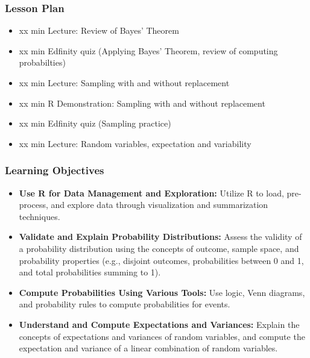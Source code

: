 \begin{frame}
    \frametitle{Lesson Plan}
    \begin{itemize}
        \item xx min Lecture: Review of Bayes' Theorem
        \item xx min Edfinity quiz (Applying Bayes' Theorem, review of computing probabilties)
        \item xx min Lecture: Sampling with and without replacement
        \item xx min R Demonstration: Sampling with and without replacement
        \item xx min Edfinity quiz (Sampling practice)
        \item xx min Lecture: Random variables, expectation and variability
    \end{itemize}
    \end{frame}
    
    \begin{frame}
    \frametitle{Learning Objectives}
    \begin{itemize}
        \item \textbf{Use R for Data Management and Exploration:} Utilize R to load, pre-process, and explore data through visualization and summarization techniques.
        \item \textbf{Validate and Explain Probability Distributions:} Assess the validity of a probability distribution using the concepts of outcome, sample space, and probability properties (e.g., disjoint outcomes, probabilities between 0 and 1, and total probabilities summing to 1).
        \item \textbf{Compute Probabilities Using Various Tools:} Use logic, Venn diagrams, and probability rules to compute probabilities for events.
        \item \textbf{Understand and Compute Expectations and Variances:} Explain the concepts of expectations and variances of random variables, and compute the expectation and variance of a linear combination of random variables.
    \end{itemize}
    \end{frame}